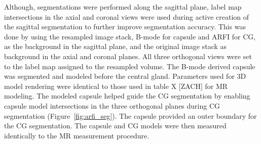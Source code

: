 Although, segmentations were performed along the sagittal plane, label map
intersections in the axial and coronal views were used during active creation
of the sagittal segmentation to further improve segmentation accuracy.  This
was done by using the resampled image stack, B-mode for capsule and ARFI for
CG, as the background in the sagittal plane, and the original image stack as
background in the axial and coronal planes. All three orthogonal views were set
to the label map assigned to the resampled volume. The B-mode derived capsule
was segmented and modeled before the central gland. Parameters used for 3D
model rendering were identical to those used in table X [ZACH] for MR modeling.
The modeled capsule helped guide the CG segmentation by enabling capsule model
intersections in the three orthogonal planes during CG segmentation
(Figure~\ref{fig:arfi_seg}). The capsule provided an outer boundary for the CG
segmentation. The capsule and CG models were then measured identically to the
MR measurement procedure.




